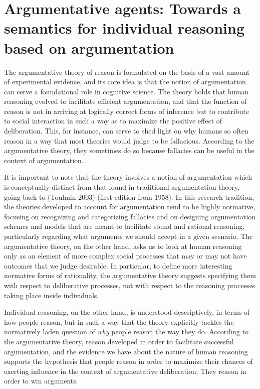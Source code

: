 \documentclass[greybox]{svmult}
\begin{document}
\section{Argumentative agents: Towards a semantics for individual reasoning based on argumentation}\label{sec:arg}

The argumentative theory of reason is formulated on the basis of a vast amount of experimental evidence, and its core idea is that the notion of argumentation can serve a foundational role in cognitive science. The theory holds that human reasoning evolved to facilitate efficient argumentation, and that the function of reason is not in arriving at logically correct forms of inference but to contribute to social interaction in such a way as to maximize the positive effect of  deliberation. This, for instance, can serve to shed light on why humans so often reason in a way that most theories would judge to be fallacious. According to the argumentative theory, they sometimes do so because fallacies can be useful in the context of argumentation.

It is important to note that the theory involves a notion of argumentation which is conceptually distinct from that found in traditional argumentation theory, going back to (Toulmin 2003) (first edition from 1958). In this research tradition, the theories developed to account for argumentation tend to be highly normative, focusing on recognizing and categorizing fallacies and on designing argumentation schemes and models that are meant to facilitate sound and rational reasoning, particularly regarding what arguments we should accept in a given scenario. The argumentative theory, on the other hand, asks us to look at human reasoning only as an element of more complex social processes that may or may not have outcomes that we judge desirable. In particular, to define more interesting normative forms of rationality, the argumentative theory suggests specifying them with respect to deliberative processes, not with respect to the reasoning processes taking place inside individuals.

Individual reasoning, on the other hand, is understood descriptively, in terms of how people reason, but in such a way that the theory explicitly tackles the normatively laden question of \emph{why} people reason the way they do. According to the argumentative theory, reason developed in order to facilitate successful argumentation, and the evidence we have about the nature of human reasoning supports the hypothesis that people reason in order to maximize their chances of exerting influence in the context of argumentative deliberation; They reason in order to win arguments.
\end{document}
